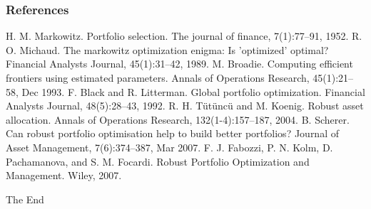 \documentclass{beamer}
\begin{document}
\begin{frame}
\frametitle{References}
\footnotesize{
\begin{thebibliography}{99} %
 H. M. Markowitz. Portfolio selection. The journal of finance, 7(1):77–91,
1952.
 R. O. Michaud. The markowitz optimization enigma: Is ’optimized’ optimal? Financial Analysts Journal, 45(1):31–42, 1989.
 M. Broadie. Computing efficient frontiers using estimated parameters. Annals of Operations Research, 45(1):21–58, Dec 1993.
 F. Black and R. Litterman. Global portfolio optimization. Financial Analysts Journal, 48(5):28–43, 1992.
 R. H. T{\"u}t{\"u}nc{\"u} and M. Koenig. Robust asset allocation. Annals of Operations Research, 132(1-4):157–187, 2004.
 B. Scherer. Can robust portfolio optimisation help to build better portfolios? Journal of Asset Management, 7(6):374–387, Mar 2007.
 F. J. Fabozzi, P. N. Kolm, D. Pachamanova, and S. M. Focardi. Robust Portfolio Optimization and Management. Wiley, 2007.
\end{thebibliography}
}
\end{frame}


\begin{frame}
\Huge{\centerline{The End}}
\end{frame}

\end{document}
